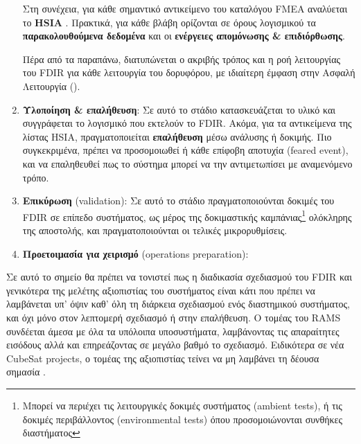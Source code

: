 \documentclass[a4paper,nobib]{tufte-book}
\begin{document}
\begin{enumerate}
	Στη συνέχεια, για κάθε σημαντικό αντικείμενο του καταλόγου \acs{FMEA} αναλύεται το \textbf{\acf{HSIA}} \autocite{ECSS-Q-ST-30-02C}. Πρακτικά, για κάθε βλάβη ορίζονται σε όρους λογισμικού τα \textbf{παρακολουθούμενα δεδομένα} και οι \textbf{ενέργειες απομόνωσης \& επιδιόρθωσης}.
	
	Πέρα από τα παραπάνω, διατυπώνεται ο ακριβής τρόπος και η ροή λειτουργίας του \acs{FDIR} για κάθε λειτουργία του δορυφόρου, με ιδιαίτερη έμφαση στην Ασφαλή Λειτουργία ().
	\label{itm:fdir_cdr}
	\item \textbf{Υλοποίηση \& επαλήθευση}: Σε αυτό το στάδιο κατασκευάζεται το υλικό και συγγράφεται το λογισμικό που εκτελούν το \acs{FDIR}. Ακόμα, για τα αντικείμενα της λίστας \acs{HSIA}, πραγματοποιείται \textbf{επαλήθευση} μέσω ανάλυσης ή δοκιμής. Πιο συγκεκριμένα, πρέπει να προσομοιωθεί ή κάθε επίφοβη αποτυχία (feared event), και να επαληθευθεί πως το σύστημα μπορεί να την αντιμετωπίσει με αναμενόμενο τρόπο.
	\label{itm:fdir_valid}
	\item \textbf{Επικύρωση} (validation): Σε αυτό το στάδιο πραγματοποιούνται δοκιμές του \acs{FDIR} σε επίπεδο συστήματος, ως μέρος της δοκιμαστικής καμπάνιας\footnote{Μπορεί να περιέχει τις λειτουργικές δοκιμές συστήματος (ambient tests), ή τις δοκιμές περιβάλλοντος (environmental tests) όπου προσομοιώνονται συνθήκες διαστήματος} ολόκληρης της αποστολής, και πραγματοποιούνται οι τελικές μικρορυθμίσεις.
	\item \textbf{Προετοιμασία για χειρισμό} (operations preparation): 
\end{enumerate}


Σε αυτό το σημείο θα πρέπει να τονιστεί πως η διαδικασία σχεδιασμού του \acs{FDIR} και γενικότερα της μελέτης αξιοπιστίας του συστήματος είναι κάτι που πρέπει να λαμβάνεται υπ' όψιν καθ' όλη τη διάρκεια σχεδιασμού ενός διαστημικού συστήματος, και όχι μόνο στον λεπτομερή σχεδιασμό ή στην επαλήθευση. Ο τομέας του \acf{RAMS} συνδέεται άμεσα με όλα τα υπόλοιπα υποσυστήματα, λαμβάνοντας τις απαραίτητες εισόδους αλλά και επηρεάζοντας σε μεγάλο βαθμό το σχεδιασμό. Ειδικότερα σε νέα CubeSat projects, ο τομέας της αξιοπιστίας τείνει να μη λαμβάνει τη δέουσα σημασία \autocite{langer_reliability_estimation_2017}.
\end{document}
